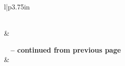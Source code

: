\begin{center} 
\begin{longtable}{l|p{3.75in}} 
\caption[Words by Length in Proverb 14]{Words by Length in Proverb 14} \label{table:WordsIn-Proverb-14} \\ 
\hline {} &  \\ \hline 
\endfirsthead 
 
{{\bfseries \tablename\ \thetable{} -- continued from previous page}} \\ 
\hline {} &  \\ \hline 
\endhead 
 
\hline {} \\ \hline 
\endfoot 
 

\end{longtable}
\end{center}

